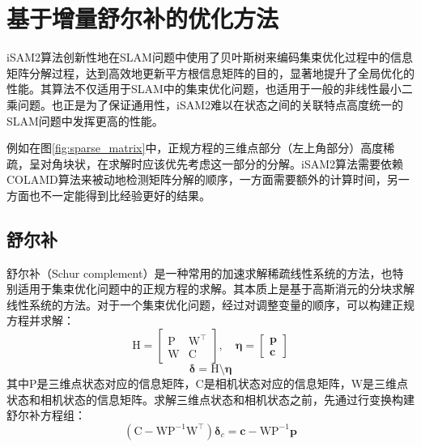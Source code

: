 \section{基于增量舒尔补的优化方法}

iSAM2算法\cite{kaess2008isam,kaess2012isam2}创新性地在SLAM问题中使用了贝叶斯树来编码集束优化过程中的信息矩阵分解过程，达到高效地更新平方根信息矩阵的目的，显著地提升了全局优化的性能。其算法不仅适用于SLAM中的集束优化问题，也适用于一般的非线性最小二乘问题。也正是为了保证通用性，iSAM2难以在状态之间的关联特点高度统一的SLAM问题中发挥更高的性能。

例如在图\ref{fig:sparse_matrix}中，正规方程的三维点部分（左上角部分）高度稀疏，呈对角块状，在求解时应该优先考虑这一部分的分解。iSAM2算法需要依赖COLAMD\citep{davis2004algorithm}算法来被动地检测矩阵分解的顺序，一方面需要额外的计算时间，另一方面也不一定能得到比经验更好的结果。

\subsection{舒尔补}

舒尔补（Schur complement）是一种常用的加速求解稀疏线性系统的方法，也特别适用于集束优化问题中的正规方程的求解。其本质上是基于高斯消元的分块求解线性系统的方法。对于一个集束优化问题，经过对调整变量的顺序，可以构建正规方程并求解：
\begin{equation}
    \mathrm{H} =
    \begin{bmatrix}
        \mathrm{P} & \mathrm{W}^\top \\
        \mathrm{W} & \mathrm{C}
    \end{bmatrix}, \quad
    \bm{\eta} = \begin{bmatrix} \bm{p} \\ \bm{c} \end{bmatrix}
\end{equation}
\begin{equation}
    \bm{\delta} =\mathrm{H}\setminus\bm{\eta}
\end{equation}
其中$\mathrm{P}$是三维点状态对应的信息矩阵，$\mathrm{C}$是相机状态对应的信息矩阵，$\mathrm{W}$是三维点状态和相机状态的信息矩阵。求解三维点状态和相机状态之前，先通过行变换构建舒尔补方程组：
\begin{equation}
    \left( \mathrm{C}-\mathrm{W}\mathrm{P}^{-1}\mathrm{W}^\top \right)
    \bm{\delta}_c = \bm{c}-\mathrm{W}\mathrm{P}^{-1}\bm{p}
    \label{eq:schur_complement}
\end{equation}

